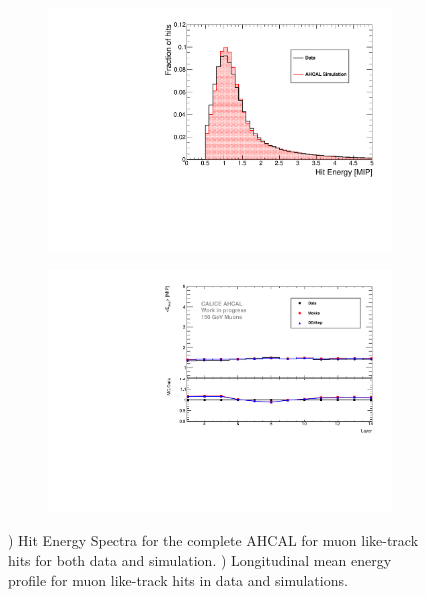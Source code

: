 \begin{figure}[htbp!]
	\centering
	\begin{subfigure}[t]{0.49\textwidth}
		\includegraphics[width=1\linewidth]{../Thesis_Plots/EnergyCalib/Plots/ComparisonMCData_MIPPeak.pdf}
		\caption{} \label{fig:MIPData_MC}
	\end{subfigure}
	\hfill
	\begin{subfigure}[t]{0.49\textwidth}
		\centering
		\includegraphics[width=1\linewidth]{../Thesis_Plots/Timing/Muons/Plots/ProfileMuons_Edep.pdf}
		\caption{} \label{fig:muEdep}
	\end{subfigure}
	\caption{) Hit Energy Spectra for the complete AHCAL for muon like-track hits for both data and simulation. ) Longitudinal mean energy profile for muon like-track hits in data and simulations.}
	\label{fig:Val}
\end{figure}

